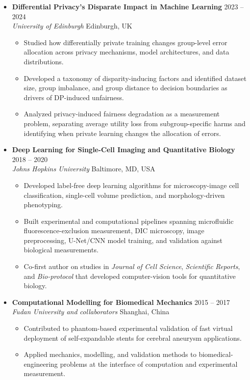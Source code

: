 \documentclass[10pt,a4paper]{article}
\newcommand{\projectentry}[4]{%
    \Needspace{4\baselineskip}%
    \item \textbf{#1} \hfill #4\\
    \textit{#2} \hfill #3
}
\begin{document}
\begin{itemize}
\projectentry{Differential Privacy's Disparate Impact in Machine Learning}{University of Edinburgh}{Edinburgh, UK}{2023 -- 2024}
    \begin{itemize}
        \item Studied how differentially private training changes group-level error allocation across privacy mechanisms, model architectures, and data distributions.
        \item Developed a taxonomy of disparity-inducing factors and identified dataset size, group imbalance, and group distance to decision boundaries as drivers of DP-induced unfairness.
        \item Analyzed privacy-induced fairness degradation as a measurement problem, separating average utility loss from subgroup-specific harms and identifying when private learning changes the allocation of errors.
    \end{itemize}

\projectentry{Deep Learning for Single-Cell Imaging and Quantitative Biology}{Johns Hopkins University}{Baltimore, MD, USA}{2018 -- 2020}
    \begin{itemize}
        \item Developed label-free deep learning algorithms for microscopy-image cell classification, single-cell volume prediction, and morphology-driven phenotyping.
        \item Built experimental and computational pipelines spanning microfluidic fluorescence-exclusion measurement, DIC microscopy, image preprocessing, U-Net/CNN model training, and validation against biological measurements.
        \item Co-first author on studies in \textit{Journal of Cell Science}, \textit{Scientific Reports}, and \textit{Bio-protocol} that developed computer-vision tools for quantitative biology.
    \end{itemize}

\projectentry{Computational Modelling for Biomedical Mechanics}{Fudan University and collaborators}{Shanghai, China}{2015 -- 2017}
    \begin{itemize}
        \item Contributed to phantom-based experimental validation of fast virtual deployment of self-expandable stents for cerebral aneurysm applications.
        \item Applied mechanics, modelling, and validation methods to biomedical-engineering problems at the interface of computation and experimental measurement.
    \end{itemize}
\end{itemize}
\end{document}
